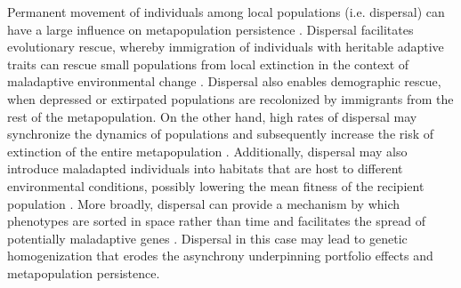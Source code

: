 \documentclass{revtex4}
\begin{document}
Permanent movement of individuals among local populations (i.e. dispersal) can have a large influence on metapopulation persistence \citep{MilnerGulland:2011vm}. 
Dispersal facilitates evolutionary rescue, whereby immigration of individuals with heritable adaptive traits can rescue small populations from local extinction in the context of maladaptive environmental change \citep{Bell:2011ki,Carlson:2014is}.
Dispersal also enables demographic rescue, when depressed or extirpated populations are recolonized by immigrants from the rest of the metapopulation.
On the other hand, high rates of dispersal may synchronize the dynamics of populations and subsequently increase the risk of extinction of the entire metapopulation \citep{Earn:2000fm,Satterthwaite:2015ge}. 
Additionally, dispersal may also introduce maladapted individuals into habitats that are host to different environmental conditions, possibly lowering the mean fitness of the recipient population \citep{Ronce:2001dp,Muhlfeld:2014hs}. 
More broadly, dispersal can provide a mechanism by which phenotypes are sorted in space rather than time and facilitates the spread of potentially maladaptive genes \citep{Lowe:2015ft}.
Dispersal in this case may lead to genetic homogenization that erodes the asynchrony underpinning portfolio effects and metapopulation persistence. 
\end{document}
